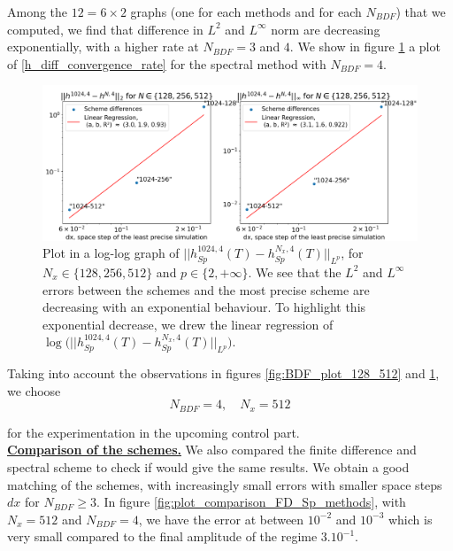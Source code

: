 \documentclass[12pt]{article}
\begin{document}
Among the $12=6\times2$ graphs (one for each methods and for each $N_{BDF}$) that we computed, we find that difference in $L^2$ and $L^{\infty}$ norm are decreasing exponentially, with a higher rate at $N_{BDF}=3$ and $4$. We show in figure \ref{fig:Convergence_plot_BDF_4_Sp} a plot of \eqref{h_diff_convergence_rate} for the spectral method with $N_{BDF}=4.$
\\

\begin{figure}
    \hspace*{-1cm}
    \includegraphics[width=1.2\linewidth]{Verif_scheme/Convergence_graph_Sp_method.png}

    \caption{Plot in a log-log graph of $||h_{Sp}^{1024,4}(T)-h_{Sp}^{N_x, 4}(T)||_{L^p}$, for $N_x \in \{128, 256, 512\}$ and $p \in \{2, +\infty\}$. We see that the $L^2$ and $L^{\infty}$ errors between the schemes and the most precise scheme are decreasing with an exponential behaviour. To highlight this exponential decrease, we drew the linear regression of $\log\big(||h_{Sp}^{1024,4}(T)-h_{Sp}^{N_x, 4}(T)||_{L^p}\big)$.}
    \label{fig:Convergence_plot_BDF_4_Sp}
\end{figure}

Taking into account the observations in figures \ref{fig:BDF_plot_128_512} and \ref{fig:Convergence_plot_BDF_4_Sp}, we choose 
\begin{equation}\label{var_final_config_tests}
\boxed{
    N_{BDF} = 4, \quad N_x = 512
}
\end{equation}

for the experimentation in the upcoming control part.
\\


\underline{\textbf{Comparison of the schemes.}} We also compared the finite difference and spectral scheme to check if would give the same results.
 We obtain a good matching of the schemes, with increasingly small errors with smaller space steps $dx$ for $N_{BDF} \geq 3.$ In figure \ref{fig:plot_comparison_FD_Sp_methods},
  with  $N_x = 512$ and  $N_{BDF}=4$, we have the error at between $10^{-2}$ and ${10^{-3}}$ which is very small compared to the final amplitude of the regime $3.10^{-1}$.
\end{document}
